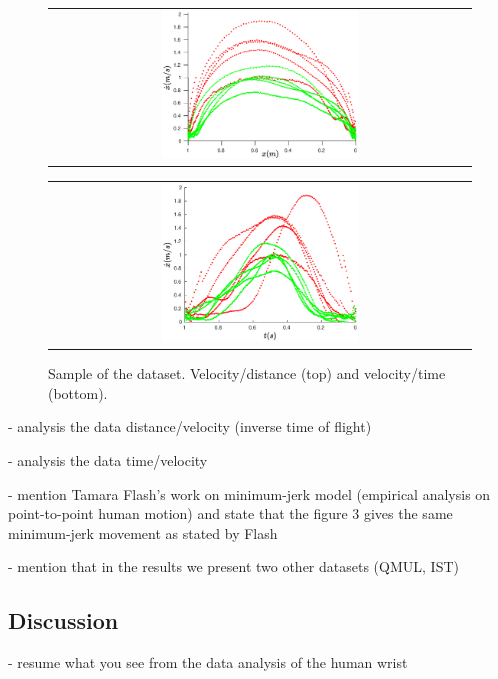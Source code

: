     \begin{figure}
        \centering
        \begin{tabular}{@{}c@{}}
            \centering
            \includegraphics[width=0.48\textwidth,height=0.25\textheight]{Images/vel_distance_plot.eps}
        \end{tabular}
        \baselineskip
        \begin{tabular}{@{}c@{}}
            \centering 
            \includegraphics[width=0.48\textwidth,height=0.25\textheight]{Images/vel_time_plot.eps}
        \end{tabular}
        \caption{Sample of the dataset. Velocity/distance (top) and velocity/time (bottom).}
        \label{fig:vel_distance_time}
    \end{figure}


- analysis the data distance/velocity (inverse time of flight)

- analysis the data time/velocity

- mention Tamara Flash's work on minimum-jerk model (empirical analysis on point-to-point human motion) and state that the figure 3 gives the same minimum-jerk movement as stated by Flash

- mention that in the results we present two other datasets (QMUL, IST)

\subsection{Discussion}

- resume what you see from the data analysis of the human wrist

